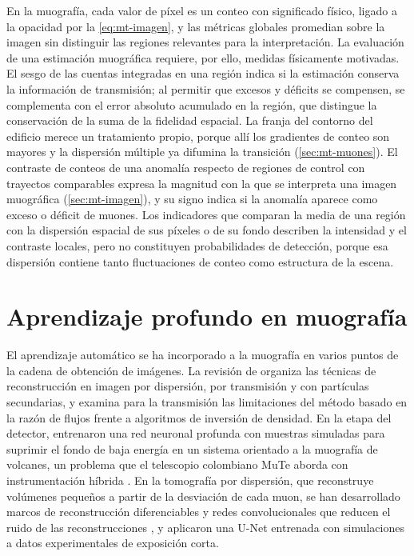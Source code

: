 En la muografía, cada valor de píxel es un conteo con significado físico, ligado a la opacidad por la \cref{eq:mt-imagen}, y las métricas globales promedian sobre la imagen sin distinguir las regiones relevantes para la interpretación. La evaluación de una estimación muográfica requiere, por ello, medidas físicamente motivadas. El sesgo de las cuentas integradas en una región indica si la estimación conserva la información de transmisión; al permitir que excesos y déficits se compensen, se complementa con el error absoluto acumulado en la región, que distingue la conservación de la suma de la fidelidad espacial. La franja del contorno del edificio merece un tratamiento propio, porque allí los gradientes de conteo son mayores y la dispersión múltiple ya difumina la transición (\cref{sec:mt-muones}). El contraste de conteos de una anomalía respecto de regiones de control con trayectos comparables expresa la magnitud con la que se interpreta una imagen muográfica (\cref{sec:mt-imagen}), y su signo indica si la anomalía aparece como exceso o déficit de muones. Los indicadores que comparan la media de una región con la dispersión espacial de sus píxeles o de su fondo describen la intensidad y el contraste locales, pero no constituyen probabilidades de detección, porque esa dispersión contiene tanto fluctuaciones de conteo como estructura de la escena.

\section{Aprendizaje profundo en muografía}
\label{sec:mt-estado-arte}

El aprendizaje automático se ha incorporado a la muografía en varios puntos de la cadena de obtención de imágenes. La revisión de \textcite{luo2025} organiza las técnicas de reconstrucción en imagen por dispersión, por transmisión y con partículas secundarias, y examina para la transmisión las limitaciones del método basado en la razón de flujos frente a algoritmos de inversión de densidad. En la etapa del detector, \textcite{galgoczi2024} entrenaron una red neuronal profunda con muestras simuladas para suprimir el fondo de baja energía en un sistema orientado a la muografía de volcanes, un problema que el telescopio colombiano MuTe aborda con instrumentación híbrida \parencite{penarodriguez2020}. En la tomografía por dispersión, que reconstruye volúmenes pequeños a partir de la desviación de cada muon, se han desarrollado marcos de reconstrucción diferenciables \parencite{sattler2025} y redes convolucionales que reducen el ruido de las reconstrucciones \parencite{vinodkumar2025}, y \textcite{wang2026} aplicaron una U-Net entrenada con simulaciones a datos experimentales de exposición corta.

